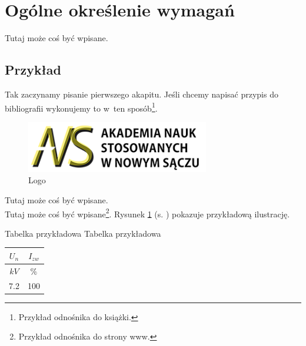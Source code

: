 \newpage
\section{Ogólne określenie wymagań}		%













\hspace{0.60cm}Tutaj może coś być wpisane. 

\subsection{Przykład}  %

\hspace{0.60cm}Tak zaczynamy pisanie pierwszego akapitu. Jeśli chcemy napisać przypis do bibliografii wykonujemy to w~ten sposób\footnote{Przykład odnośnika do książki\cite{legierski}.}.

	\begin{figure}[!htb]
	\begin{center}
		\includegraphics[width=8cm]{rys/ans.png}
		\caption{Logo}
		\label{rys:rysunek001}
	\end{center}
\end{figure}

Tutaj może coś być wpisane. \\Tutaj może coś być wpisane\footnote{Przykład odnośnika do strony www\cite{www1}.}. 
Rysunek \ref{rys:rysunek001} (s. \pageref{rys:rysunek001}) pokazuje przykładową ilustrację.

\begin{tabela}
	{Tabelka przykładowa}	%
	{Tabelka przykładowa}	%
	{
		\begin{tabular}{|c|c|} \hline
			$U_n$ & $I_{zw}$ \\ \hline
			$kV$  & $\%$      \\ \hline
			7.2 & 100 \\ \hline
		\end{tabular}
	}
	\label{tab:tablica001}
\end{tabela}

